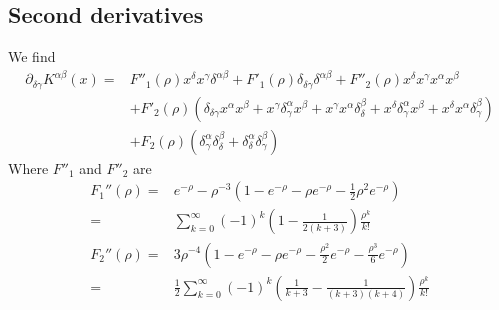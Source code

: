 \documentclass[12pt]{amsart}
\begin{document}
\subsection{Second derivatives}
We find
\begin{align*}
  \partial_{\delta\gamma}K^{\alpha\beta}(x) =& F''_1(\rho) x^\delta x^\gamma \delta^{\alpha\beta} + F'_1(\rho) \delta_{\delta\gamma} \delta^{\alpha\beta} + F''_2(\rho) x^\delta x^\gamma x^\alpha x^\beta \\
  &+ F'_2(\rho) \left( \delta_{\delta\gamma} x^\alpha x^\beta
    + x^\gamma \delta^\alpha_\gamma x^\beta 
    + x^\gamma x^\alpha \delta_\delta^\beta
    + x^\delta \delta_\gamma^\alpha x^\beta 
    + x^\delta x^\alpha \delta_\gamma^\beta \right) \\
  &+ F_2(\rho) \left( \delta_\gamma^\alpha \delta_\delta^\beta + \delta_\delta^\alpha \delta_\gamma^\beta \right)
\end{align*}
Where $F''_1$ and $F''_2$ are
\begin{align*}
  F_1''(\rho) =& e^{-\rho} - \rho^{-3} \left( 1 - e^{-\rho} - \rho e^{-\rho} - \frac{1}{2} \rho^2 e^{-\rho} \right)\\
  =& \sum_{k=0}^{\infty} (-1)^k \left( 1 - \frac{1}{2(k+3)} \right) \frac{\rho^k}{k!} \\
  F_2''(\rho) =& 3 \rho^{-4} \left( 1 - e^{-\rho} - \rho e^{-\rho} - \frac{\rho^2}{2} e^{-\rho}  - \frac{\rho^3}{6}e^{-\rho} \right) \\
  =& \frac{1}{2} \sum_{k=0}^{\infty} (-1)^{k} \left( \frac{1}{k+3} - \frac{1}{(k+3)(k+4)} \right) \frac{\rho^k}{k!}
\end{align*}
\end{document}
